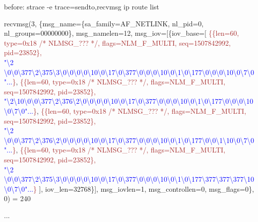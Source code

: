 \documentclass[unicode,aspectratio=169]{beamer}
\begin{document}
\begin{frame}[fragile]{\small before: strace -e trace=sendto,recvmsg ip route list}
{recvmsg(3, \{msg\_name=\{sa\_family=AF\_NETLINK, nl\_pid=0, nl\_groups=00000000\}, msg\_namelen=12, msg\_iov=[\{iov\_base=[
\textcolor{brown}{\{\{len=60, type=0x18 /* NLMSG\_??? */, flags=NLM\_F\_MULTI, seq=1507842992, pid=23852\}, \\
\textcolor{blue}{"\textbackslash{}2 \textbackslash{}0\textbackslash{}0\textbackslash{}377\textbackslash{}2\textbackslash{}375\textbackslash{}3\textbackslash{}0\textbackslash{}0\textbackslash{}0\textbackslash{}0\textbackslash{}10\textbackslash{}0\textbackslash{}17\textbackslash{}0\textbackslash{}377\textbackslash{}0\textbackslash{}0\textbackslash{}0\textbackslash{}10\textbackslash{}0\textbackslash{}1\textbackslash{}0\textbackslash{}177\textbackslash{}0\textbackslash{}0\textbackslash{}0\textbackslash{}10\textbackslash{}0\textbackslash{}7\textbackslash{}0"...}\}},
\textcolor{brown}{\{\{len=60, type=0x18 /* NLMSG\_??? */, flags=NLM\_F\_MULTI, seq=1507842992, pid=23852\}, \\
\textcolor{blue}{"\textbackslash{}2\textbackslash{}10\textbackslash{}0\textbackslash{}0\textbackslash{}377\textbackslash{}2\textbackslash{}376\textbackslash{}2\textbackslash{}0\textbackslash{}0\textbackslash{}0\textbackslash{}0\textbackslash{}10\textbackslash{}0\textbackslash{}17\textbackslash{}0\textbackslash{}377\textbackslash{}0\textbackslash{}0\textbackslash{}0\textbackslash{}10\textbackslash{}0\textbackslash{}1\textbackslash{}0\textbackslash{}177\textbackslash{}0\textbackslash{}0\textbackslash{}0\textbackslash{}10\textbackslash{}0\textbackslash{}7\textbackslash{}0"...}\}},
\textcolor{brown}{\{\{len=60, type=0x18 /* NLMSG\_??? */, flags=NLM\_F\_MULTI, seq=1507842992, pid=23852\}, \\
\textcolor{blue}{"\textbackslash{}2 \textbackslash{}0\textbackslash{}0\textbackslash{}377\textbackslash{}2\textbackslash{}376\textbackslash{}2\textbackslash{}0\textbackslash{}0\textbackslash{}0\textbackslash{}0\textbackslash{}10\textbackslash{}0\textbackslash{}17\textbackslash{}0\textbackslash{}377\textbackslash{}0\textbackslash{}0\textbackslash{}0\textbackslash{}10\textbackslash{}0\textbackslash{}1\textbackslash{}0\textbackslash{}177\textbackslash{}0\textbackslash{}0\textbackslash{}1\textbackslash{}10\textbackslash{}0\textbackslash{}7\textbackslash{}0"...}\}},
\textcolor{brown}{\{\{len=60, type=0x18 /* NLMSG\_??? */, flags=NLM\_F\_MULTI, seq=1507842992, pid=23852\}, \\
\textcolor{blue}{"\textbackslash{}2 \textbackslash{}0\textbackslash{}0\textbackslash{}377\textbackslash{}2\textbackslash{}375\textbackslash{}3\textbackslash{}0\textbackslash{}0\textbackslash{}0\textbackslash{}0\textbackslash{}10\textbackslash{}0\textbackslash{}17\textbackslash{}0\textbackslash{}377\textbackslash{}0\textbackslash{}0\textbackslash{}0\textbackslash{}10\textbackslash{}0\textbackslash{}1\textbackslash{}0\textbackslash{}177\textbackslash{}377\textbackslash{}377\textbackslash{}377\textbackslash{}10\textbackslash{}0\textbackslash{}7\textbackslash{}0"...}\}}
], iov\_len=32768\}], msg\_iovlen=1, msg\_controllen=0, msg\_flags=0\}, 0) = 240

...
}
\end{frame}
\end{document}
